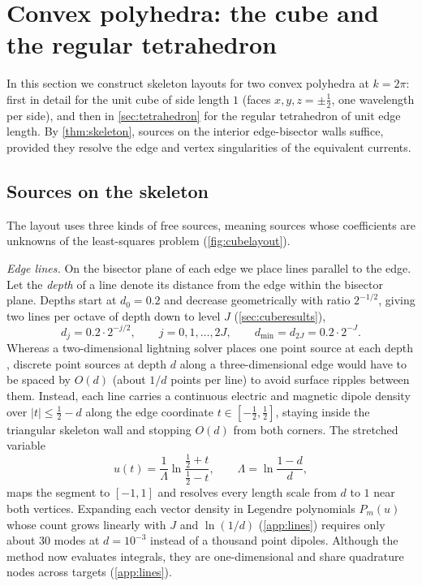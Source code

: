 \section{Convex polyhedra: the cube and the regular tetrahedron}
\label{sec:cube}

In this section we construct skeleton layouts for two convex polyhedra at $k = 2\pi$: first in detail for the unit cube of side length $1$ (faces $x,y,z=\pm\tfrac12$, one wavelength per side), and then in \autoref{sec:tetrahedron} for the regular tetrahedron of unit edge length. By \autoref{thm:skeleton}, sources on the interior edge-bisector walls suffice, provided they resolve the edge and vertex singularities of the equivalent currents.

\subsection{Sources on the skeleton}
\label{sec:cubelayout}

The layout uses three kinds of free sources, meaning sources whose coefficients are unknowns of the least-squares problem (\autoref{fig:cubelayout}).

\emph{Edge lines.} On the bisector plane of each edge we place lines parallel to the edge. Let the \emph{depth} of a line denote its distance from the edge within the bisector plane. Depths start at $d_0 = 0.2$ and decrease geometrically with ratio $2^{-1/2}$, giving two lines per octave of depth down to level $J$ (\autoref{sec:cuberesults}),
\begin{equation}
  d_j = 0.2\cdot2^{-j/2}, \qquad j = 0,1,\dots,2J, \qquad d_{\min} = d_{2J} = 0.2\cdot 2^{-J}.
  \label{eq:depths}
\end{equation}
Whereas a two-dimensional lightning solver places one point source at each depth \cite{gopal2019siam}, discrete point sources at depth $d$ along a three-dimensional edge would have to be spaced by $O(d)$ (about $1/d$ points per line) to avoid surface ripples between them. Instead, each line carries a continuous electric and magnetic dipole density over $|t|\le\tfrac12-d$ along the edge coordinate $t\in[-\tfrac12,\tfrac12]$, staying inside the triangular skeleton wall and stopping $O(d)$ from both corners. The stretched variable
\begin{equation}
  u(t) = \frac{1}{\Lambda}\ln\frac{\tfrac12+t}{\tfrac12-t}, \qquad \Lambda = \ln\frac{1-d}{d},
\end{equation}
maps the segment to $[-1,1]$ and resolves every length scale from $d$ to $1$ near both vertices. Expanding each vector density in Legendre polynomials $P_m(u)$ whose count grows linearly with $J$ and $\ln(1/d)$ (\ref{app:lines}) requires only about $30$ modes at $d = 10^{-3}$ instead of a thousand point dipoles. Although the method now evaluates integrals, they are one-dimensional and share quadrature nodes across targets (\ref{app:lines}).

